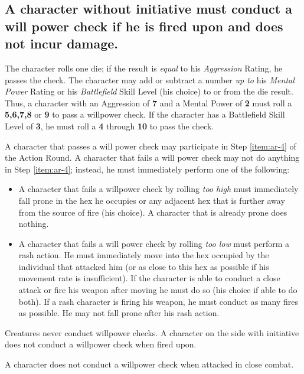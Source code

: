 \subsection[Will Power Check]{A character without initiative must
  conduct a will power check if he is fired upon and does not incur
  damage.} 
\label{sec:will-power-check}



The character rolls one die; if the result is \emph{equal} to his
\emph{Aggression} Rating, he passes the check. The character may add
or subtract a number \emph{up to} his \emph{Mental Power} Rating or
his \emph{Battlefield} Skill Level (his choice) to or from the die
result. Thus, a character with an Aggression of \textbf{7} and a
Mental Power of \textbf{2} must roll a \textbf{5,6,7,8} or \textbf{9}
to pass a willpower check. If the character has a Battlefield Skill
Level of \textbf{3}, he must roll a \textbf{4} through \textbf{10} to
pass the check.

A character that passes a will power check may participate in Step
\ref{item:ar-4} of the Action Round. A character that fails a will
power check may not do anything in Step \ref{item:ar-4}; instead, he
must immediately perform one of the following:

\begin{itemize}
\item A character that fails a willpower check by rolling \emph{too
    high} must immediately fall prone in the hex he occupies or any
  adjacent hex that is further away from the source of fire (his
  choice). A character that is already prone does nothing.
\item A character that fails a will power check by rolling \emph{too
    low} must perform a rash action. He must immediately move into the
  hex occupied by the individual that attacked him (or as close to
  this hex as possible if his movement rate is insufficient). If the
  character is able to conduct a close attack or fire his weapon after
  moving he must do so (his choice if able to do both). If a rash
  character is firing his weapon, he must conduct as many fires as
  possible. He may not fall prone after his rash action.
\end{itemize}

Creatures never conduct willpower checks. A character on the side with
initiative does not conduct a willpower check when fired upon.

A character does not conduct a willpower check when attacked in close
combat.


